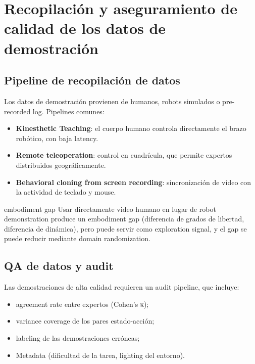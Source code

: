 \section{Recopilación y aseguramiento de calidad de los datos de demostración}

\subsection{Pipeline de recopilación de datos}

Los datos de demostración provienen de humanos, robots simulados o pre-recorded log. Pipelines comunes:
\begin{itemize}
    \item \textbf{Kinesthetic Teaching}: el cuerpo humano controla directamente el brazo robótico, con baja latency.
    \item \textbf{Remote teleoperation}: control en cuadrícula, que permite expertos distribuidos geográficamente.
    \item \textbf{Behavioral cloning from screen recording}: sincronización de video con la actividad de teclado y mouse.
\end{itemize}

\begin{knowledgebox}{embodiment gap}
Usar directamente video humano en lugar de robot demonstration produce un embodiment gap (diferencia de grados de libertad, diferencia de dinámica), pero puede servir como exploration signal, y el gap se puede reducir mediante domain randomization.
\end{knowledgebox}

\subsection{QA de datos y audit}

Las demostraciones de alta calidad requieren un audit pipeline, que incluye:
\begin{itemize}
    \item agreement rate entre expertos (Cohen's κ);
    \item variance coverage de los pares estado-acción;
    \item labeling de las demostraciones erróneas;
    \item Metadata (dificultad de la tarea, lighting del entorno).
\end{itemize}

